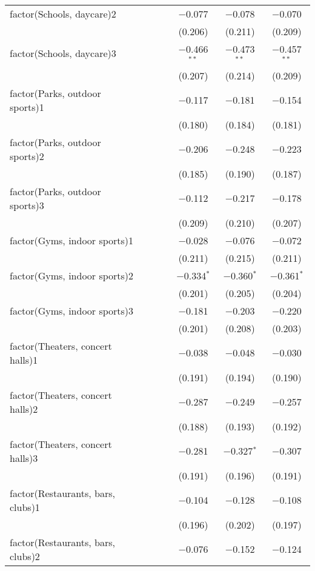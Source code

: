 \begin{table}[!htbp]
\begin{tabular}{@{\extracolsep{5pt}}lcccccc}
  factor(Schools, daycare)2 &  &  &  & $-$0.077 & $-$0.078 & $-$0.070 \\ 
  &  &  &  & (0.206) & (0.211) & (0.209) \\ 
  factor(Schools, daycare)3 &  &  &  & $-$0.466$^{**}$ & $-$0.473$^{**}$ & $-$0.457$^{**}$ \\ 
  &  &  &  & (0.207) & (0.214) & (0.209) \\ 
  factor(Parks, outdoor sports)1 &  &  &  & $-$0.117 & $-$0.181 & $-$0.154 \\ 
  &  &  &  & (0.180) & (0.184) & (0.181) \\ 
  factor(Parks, outdoor sports)2 &  &  &  & $-$0.206 & $-$0.248 & $-$0.223 \\ 
  &  &  &  & (0.185) & (0.190) & (0.187) \\ 
  factor(Parks, outdoor sports)3 &  &  &  & $-$0.112 & $-$0.217 & $-$0.178 \\ 
  &  &  &  & (0.209) & (0.210) & (0.207) \\ 
  factor(Gyms, indoor sports)1 &  &  &  & $-$0.028 & $-$0.076 & $-$0.072 \\ 
  &  &  &  & (0.211) & (0.215) & (0.211) \\ 
  factor(Gyms, indoor sports)2 &  &  &  & $-$0.334$^{*}$ & $-$0.360$^{*}$ & $-$0.361$^{*}$ \\ 
  &  &  &  & (0.201) & (0.205) & (0.204) \\ 
  factor(Gyms, indoor sports)3 &  &  &  & $-$0.181 & $-$0.203 & $-$0.220 \\ 
  &  &  &  & (0.201) & (0.208) & (0.203) \\ 
  factor(Theaters, concert halls)1 &  &  &  & $-$0.038 & $-$0.048 & $-$0.030 \\ 
  &  &  &  & (0.191) & (0.194) & (0.190) \\ 
  factor(Theaters, concert halls)2 &  &  &  & $-$0.287 & $-$0.249 & $-$0.257 \\ 
  &  &  &  & (0.188) & (0.193) & (0.192) \\ 
  factor(Theaters, concert halls)3 &  &  &  & $-$0.281 & $-$0.327$^{*}$ & $-$0.307 \\ 
  &  &  &  & (0.191) & (0.196) & (0.191) \\ 
  factor(Restaurants, bars, clubs)1 &  &  &  & $-$0.104 & $-$0.128 & $-$0.108 \\ 
  &  &  &  & (0.196) & (0.202) & (0.197) \\ 
  factor(Restaurants, bars, clubs)2 &  &  &  & $-$0.076 & $-$0.152 & $-$0.124 \\ 

\end{tabular}
\end{table}
